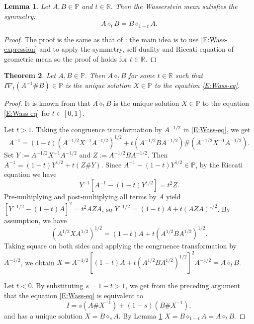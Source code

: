 \documentclass[12pt,reqno]{amsart}
\newtheorem{theorem}{Theorem}[section]
\newtheorem{lemma}[theorem]{Lemma}
\begin{document}
\begin{lemma} \label{L:Wass-symmetry}
Let $A, B \in \mathbb{P}$ and $t \in \mathbb{R}$. Then the Wasserstein mean satisfies the symmetry:
\begin{displaymath}
A \diamond_t B =  B \diamond_{1-t} A.
\end{displaymath}
\end{lemma}

\begin{proof}
The proof is the same as that of \cite[Lemma 2.6]{HK19}: the main idea is to use \eqref{E:Wass-expression} and to apply the symmetry, self-duality and Riccati equation of geometric mean so the proof of \cite[Lemma 2.6]{HK19} holds for $t \in \mathbb{R}$.
\end{proof}


\begin{theorem}
Let $A, B \in \mathbb{P}$. Then $A \diamond_{t} B$ for some $t \in \mathbb{R}$ such that $I \nabla_{t} (A^{-1} \# B) \in \mathbb{P}$ is the unique solution $X \in \mathbb{P}$ to the equation \eqref{E:Wass-eq}.
\end{theorem}

\begin{proof}
It is known from \cite[Theorem 5.1]{HK19} that $A \diamond_{t} B$ is the unique solution $X \in \mathbb{P}$ to the equation \eqref{E:Wass-eq} for $t \in [0,1]$.

Let $t > 1$. Taking the congruence transformation by $A^{-1/2}$ in \eqref{E:Wass-eq}, we get
\begin{displaymath}
A^{-1} = (1-t)(A^{-1/2} X^{-1} A^{-1/2})^{1/2} + t(A^{-1/2} B A^{-1/2}) \# (A^{-1/2} X^{-1} A^{-1/2}).
\end{displaymath}
Set $Y := A^{-1/2} X^{-1} A^{-1/2}$ and $Z := A^{-1/2} B A^{-1/2}$. Then $A^{-1} = (1-t)Y^{1/2} + t(Z \# Y)$. Since $A^{-1} - (1-t) Y^{1/2} \in \mathbb{P}$, by the Riccati equation we have
\begin{displaymath}
[A^{-1} - (1-t)Y^{1/2}] Y^{-1} [A^{-1} - (1-t)Y^{1/2}] = t^{2} Z.
\end{displaymath}
Pre-multiplying and post-multiplying all terms by $A$ yield $\left[ Y^{-1/2} - (1-t) A \right]^{2} = t^{2} AZA$, so $Y^{-1/2} = (1-t)A + t(AZA)^{1/2}$. By assumption, we have
\begin{displaymath}
(A^{1/2}XA^{1/2})^{1/2}= (1-t)A + t(A^{1/2}BA^{1/2})^{1/2}.
\end{displaymath}
Taking square on both sides and applying the congruence transformation by $A^{-1/2}$, we obtain $X = A^{-1/2} [ (1-t)A + t(A^{1/2}BA^{1/2})^{1/2} ]^{2} A^{-1/2} = A \diamond_{t} B$.

Let $t < 0$. By substituting $s = 1-t > 1$, we get from the preceding argument that the equation \eqref{E:Wass-eq} is equivalent to
 \begin{displaymath}
I = s (A \# X^{-1}) + (1-s) (B \# X^{-1}),
\end{displaymath}
and has a unique solution $X = B \diamond_{s} A$. By Lemma \ref{L:Wass-symmetry} $X = B \diamond_{1-t} A = A \diamond_{t} B$.
\end{proof}
\end{document}
